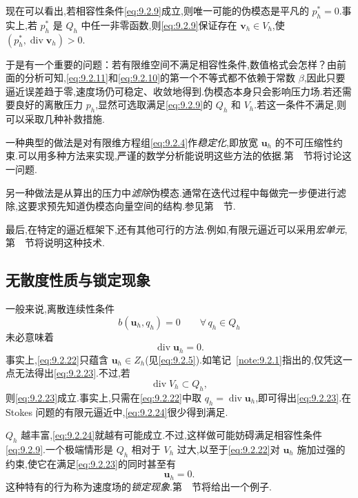 现在可以看出,若相容性条件\eqref{eq:9.2.9}成立,则唯一可能的伪模态是平凡的 \(p_h^*=0\).事实上,若 \(p_h^*\) 是 \(Q_h\) 中任一非零函数,则\eqref{eq:9.2.9}保证存在 \(\boldsymbol{v}_h\in V_h\),使 \((p_h^*,\operatorname{div}\boldsymbol{v}_h)>0\).

于是有一个重要的问题：若有限维空间不满足相容性条件,数值格式会怎样？由前面的分析可知,\eqref{eq:9.2.11}和\eqref{eq:9.2.10}的第一个不等式都不依赖于常数 \(\beta\),因此只要逼近误差趋于零,速度场仍可稳定、收敛地得到.伪模态本身只会影响压力场.若还需要良好的离散压力 \(p_h\),显然可选取满足\eqref{eq:9.2.9}的 \(Q_h\) 和 \(V_h\).若这一条件不满足,则可以采取几种补救措施.

一种典型的做法是对有限维方程组\eqref{eq:9.2.4}作\emph{稳定化},即放宽 \(\boldsymbol{u}_h\) 的不可压缩性约束.可以用多种方法来实现,严谨的数学分析能说明这些方法的依据.第~~节将讨论这一问题.

另一种做法是从算出的压力中\emph{滤除}伪模态.通常在迭代过程中每做完一步便进行滤除,这要求预先知道伪模态向量空间的结构.参见第~~节.

最后,在特定的逼近框架下,还有其他可行的方法.例如,有限元逼近可以采用\emph{宏单元},第~~节将说明这种技术.

\subsection{无散度性质与锁定现象}\label{sec:9.2.3}

一般来说,离散连续性条件
\begin{equation}\label{eq:9.2.22}
  b(\boldsymbol{u}_h,q_h)=0\qquad\forall\,q_h\in Q_h
\end{equation}
未必意味着
\begin{equation}\label{eq:9.2.23}
  \operatorname{div}\boldsymbol{u}_h=0.
\end{equation}
事实上,\eqref{eq:9.2.22}只蕴含 \(\boldsymbol{u}_h\in Z_h\)(见\eqref{eq:9.2.5}).如笔记~\ref{note:9.2.1}指出的,仅凭这一点无法得出\eqref{eq:9.2.23}.不过,若
\begin{equation}\label{eq:9.2.24}
  \operatorname{div}V_h\subset Q_h,
\end{equation}
则\eqref{eq:9.2.23}成立.事实上,只需在\eqref{eq:9.2.22}中取 \(q_h=\operatorname{div}\boldsymbol{u}_h\),即可得出\eqref{eq:9.2.23}.在 Stokes 问题的有限元逼近中,\eqref{eq:9.2.24}很少得到满足.

\(Q_h\) 越丰富,\eqref{eq:9.2.24}就越有可能成立.不过,这样做可能妨碍满足相容性条件\eqref{eq:9.2.9}.一个极端情形是 \(Q_h\) 相对于 \(V_h\) 过大,以至于\eqref{eq:9.2.22}对 \(\boldsymbol{u}_h\) 施加过强的约束,使它在满足\eqref{eq:9.2.23}的同时甚至有
\[
  \boldsymbol{u}_h=0.
\]
这种特有的行为称为速度场的\emph{锁定现象}.第~~节将给出一个例子.

